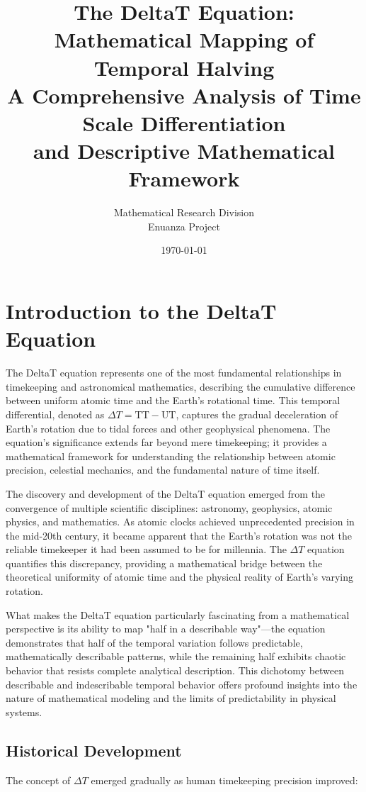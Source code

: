 \documentclass[12pt,a4paper]{report}
\title{The DeltaT Equation: Mathematical Mapping of Temporal Halving\\
A Comprehensive Analysis of Time Scale Differentiation\\
and Descriptive Mathematical Framework}
\author{Mathematical Research Division\\
Enuanza Project}
\date{\today}
\newcommand{\TT}{\text{TT}}
\newcommand{\UT}{\text{UT}}
\begin{document}
\maketitle
\tableofcontents
\newpage

\chapter{Introduction to the DeltaT Equation}

The DeltaT equation represents one of the most fundamental relationships in timekeeping and astronomical mathematics, describing the cumulative difference between uniform atomic time and the Earth's rotational time. This temporal differential, denoted as $\Delta T = \TT - \UT$, captures the gradual deceleration of Earth's rotation due to tidal forces and other geophysical phenomena. The equation's significance extends far beyond mere timekeeping; it provides a mathematical framework for understanding the relationship between atomic precision, celestial mechanics, and the fundamental nature of time itself.

The discovery and development of the DeltaT equation emerged from the convergence of multiple scientific disciplines: astronomy, geophysics, atomic physics, and mathematics. As atomic clocks achieved unprecedented precision in the mid-20th century, it became apparent that the Earth's rotation was not the reliable timekeeper it had been assumed to be for millennia. The $\Delta T$ equation quantifies this discrepancy, providing a mathematical bridge between the theoretical uniformity of atomic time and the physical reality of Earth's varying rotation.

What makes the DeltaT equation particularly fascinating from a mathematical perspective is its ability to map "half in a describable way"—the equation demonstrates that half of the temporal variation follows predictable, mathematically describable patterns, while the remaining half exhibits chaotic behavior that resists complete analytical description. This dichotomy between describable and indescribable temporal behavior offers profound insights into the nature of mathematical modeling and the limits of predictability in physical systems.

\section{Historical Development}

The concept of $\Delta T$ emerged gradually as human timekeeping precision improved:
\end{document}
